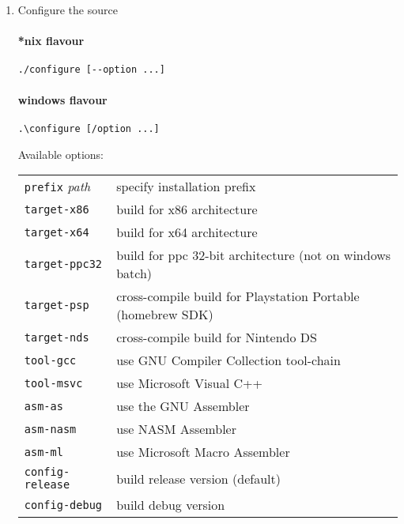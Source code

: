 \begin{enumerate}
\item Configure the source

\paragraph{*nix flavour}
\begin{lstlisting}
./configure [--option ...]
\end{lstlisting}

\paragraph{windows flavour}

\begin{lstlisting}
.\configure [/option ...]
\end{lstlisting}

Available options:

\begin{tabular}{ll}	
{\tt prefix} {\it path} & specify installation prefix \\
{\tt target-x86}   & build for x86 architecture \\
{\tt target-x64}   & build for x64 architecture \\
{\tt target-ppc32} & build for ppc 32-bit architecture (not on windows batch)\\
{\tt target-psp}   & cross-compile build for Playstation Portable (homebrew SDK)\\
{\tt target-nds}   & cross-compile build for Nintendo DS \\
{\tt tool-gcc}     & use GNU Compiler Collection tool-chain \\
{\tt tool-msvc}    & use Microsoft Visual C++ \\
{\tt asm-as}       & use the GNU Assembler \\
{\tt asm-nasm}     & use NASM Assembler \\
{\tt asm-ml}       & use Microsoft Macro Assembler \\
{\tt config-release} & build release version (default) \\
{\tt config-debug} & build debug version \\
\end{tabular}


\end{enumerate}
